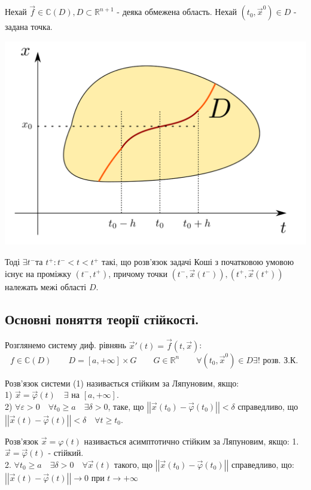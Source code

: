 \documentclass[14pt,a4paper]{scrartcl}
\theoremstyle{definition}
\theoremstyle{remark}
\theoremstyle{definition}
\theoremstyle{definition}
\begin{document}
\begin{boxteo}
    Нехай $\vec{f} \in \mathbb{C}(D), D \subset \mathbb{R}^{n+1}$ - деяка обмежена область. Нехай $(t_0, \vec{x}^0) \in D$ - задана точка.

    \begin{center} \includegraphics[scale=0.3]{assets/lectures-d0fd0868.png} \end{center}
    Тоді $\exists t^{-} $та  $t^{+} :  t^{-} < t < t^{+}$ такі, що розв'язок задачі Коші з початковою умовою існує на проміжку $ (t^{-}, t^{+})$, причому точки $ (t^-, \vec{x} (t^-)), (t^+, \vec{x} (t^+))$ належать межі області $D$.
\end{boxteo}
\subsection{Основні поняття теорії стійкості.}
Розглянемо систему диф. рівнянь $\vec{x}'(t) = \vec{f} (t, \vec{x})$:
$$f \in   \mathbb{C}(D)\qquad D = [a, +\infty ]  \times G\qquad G \in \mathbb{R}^{n} \qquad  \forall (t_0, \vec{x}^0) \in D  \exists! \text{ розв. З.К. } $$

\bd Розв'язок системи (1) називається стійким за Ляпуновим, якщо:\\
1) $\vec{x} = \vec{\varphi } (t)  \quad \exists$ на $[a, +\infty]$.\\
2) $\forall \varepsilon > 0 \quad \forall t_0 \geq a \quad \exists \delta > 0$, таке, що $ \left|\left| \vec{x}(t_0) - \vec{\varphi}(t_0) \right|\right| < \delta $ справедливо, що $ \left| \left|
\vec{x} (t) - \vec{\varphi} (t)
  \right|  \right|  < \delta  \quad \forall t \geq t_0$.
\ed

\bd
Розв'язок $ \vec{x} = \varphi(t) $ називається асимптотично стійким за Ляпуновим, якщо:
1. $ \vec{x} = \vec{\varphi} (t)$ - стійкий.\\
2. $\forall t_0 \geq a \quad \exists \delta > 0 \quad \forall \vec{x} (t) $ такого, що $ \left|
\left|  \vec{x} (t_0) - \vec{\varphi} (t_0) \right|
 \right| $ справедливо, що: \\ $  \left|
 \left|  \vec{x} (t) - \vec{\varphi} (t) \right|
  \right| \to 0   $ при $ t \to + \infty$
\ed
\end{document}
